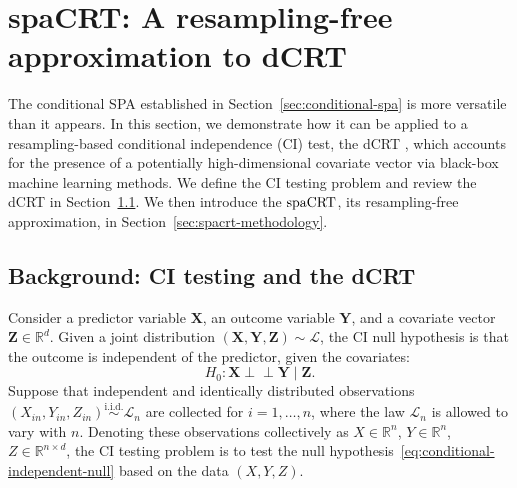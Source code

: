 \documentclass[12pt]{article}
\theoremstyle{definition}
\newcommand{\indep}{\perp \!\!\! \perp}
\newcommand{\R}{\mathbb{R}}								%
\newcommand{\iidsim}{\stackrel{\mathrm{i.i.d.}}{\sim}} 	%
\newcommand{\prx}{\bm X}								%
\newcommand{\srx}{X}									%
\newcommand{\prz}{\bm Z}								%
\newcommand{\srz}{Z}									%
\newcommand{\pry}{{\bm Y}}								%
\newcommand{\sry}{Y}									%
\newcommand{\law}{\mathcal L}							%
\newcommand{\spacrt}{\textnormal{spaCRT}}               %
\begin{document}
  \section{spaCRT: A resampling-free approximation to dCRT} \label{sec:spacrt}

  The conditional SPA established in Section~\ref{sec:conditional-spa} is more versatile than it appears. In this section, we demonstrate how it can be applied to a resampling-based conditional independence (CI) test, the dCRT \citep{Liu2022a}, which accounts for the presence of a potentially high-dimensional covariate vector via black-box machine learning methods. We define the CI testing problem and review the dCRT in Section~\ref{sec:background}. We  then introduce the $\spacrt$, its resampling-free approximation, in Section~\ref{sec:spacrt-methodology}.
  
  \subsection{Background: CI testing and the dCRT}\label{sec:background}

  Consider a predictor variable $\prx$, an outcome variable $\pry$, and a covariate vector $\prz \in \R^d$. Given a joint distribution $(\prx, \pry, \prz) \sim \law$, the CI null hypothesis is that the outcome is independent of the predictor, given the covariates:
  \begin{equation}\label{eq:conditional-independent-null}
  H_0: \prx \indep \pry \mid \prz. 
  \end{equation}
  Suppose that independent and identically distributed observations $(\srx_{in}, \sry_{in}, \srz_{in}) \iidsim \law_n$ are collected for $i = 1, \dots, n$, where the law $\law_n$ is allowed to vary with $n$. Denoting these observations collectively as $\srx \in \R^n$, $\sry \in \R^n$, $\srz \in \R^{n \times d}$, the CI testing problem is to test the null hypothesis~\eqref{eq:conditional-independent-null} based on the data $(\srx, \sry, \srz)$.
  
\end{document}
